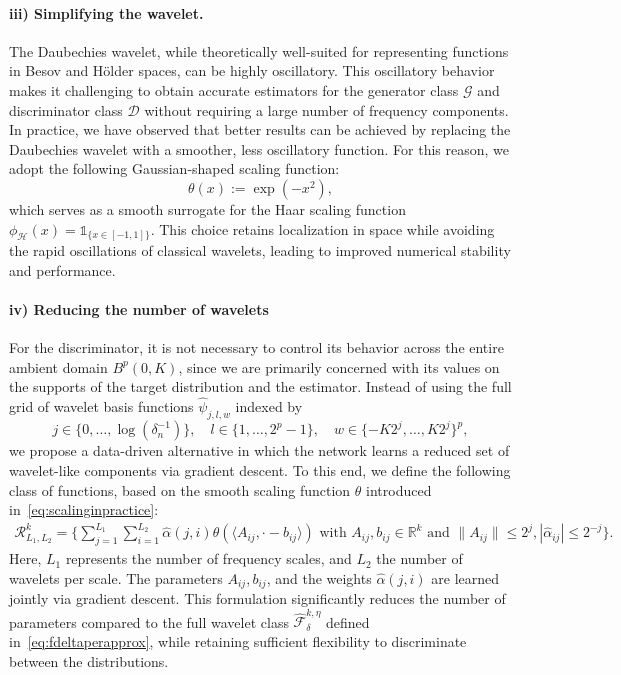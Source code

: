 \documentclass[10pt]{article}
\begin{document}
\paragraph{iii) Simplifying the wavelet.}
The Daubechies wavelet, while theoretically well-suited for representing functions in Besov and Hölder spaces, can be highly oscillatory. This oscillatory behavior makes it challenging to obtain accurate estimators for the generator class \( \mathcal{G} \) and discriminator class \( \mathcal{D} \) without requiring a large number of frequency components.
In practice, we have observed that better results can be achieved by replacing the Daubechies wavelet with a smoother, less oscillatory function. For this reason, we adopt the following Gaussian-shaped scaling function:
\begin{equation}\label{eq:scalinginpractice}
    \theta(x) := \exp(-x^2),
\end{equation}
which serves as a smooth surrogate for the Haar scaling function \( \phi_{\mathcal{H}}(x) = \mathds{1}_{\{x \in [-1,1]\}} \). This choice retains localization in space while avoiding the rapid oscillations of classical wavelets, leading to improved numerical stability and performance.


\paragraph{iv) Reducing the number of wavelets} For the discriminator, it is not necessary to control its behavior across the entire ambient domain \( B^{p}(0, K) \), since we are primarily concerned with its values on the supports of the target distribution and the estimator. Instead of using the full grid of wavelet basis functions \( \hat{\psi}_{j,l,w} \) indexed by
\[
j \in \{0, \dots, \log(\delta_n^{-1})\}, \quad l \in \{1, \dots, 2^p - 1\}, \quad w \in \{-K2^j, \dots, K2^j\}^p,
\]
we propose a data-driven alternative in which the network learns a reduced set of wavelet-like components via gradient descent. To this end, we define the following class of functions, based on the smooth scaling function \( \theta \) introduced in~\eqref{eq:scalinginpractice}: 
\begin{align}\label{eq:practical classes}
\mathcal{R}_{L_1,L_2}^{k}=\Big\{\sum \limits_{j=1}^{L_1}  \sum \limits_{i=1}^{L_2} \hat{\alpha}(j,i) \theta(\langle A_{ij},\cdot-b_{ij}\rangle) \text{ with } A_{ij},b_{ij}\in \mathbb{R}^{k} \text{ and } \|A_{ij}\|\leq 2^{j},|\hat{\alpha}_{ij}|\leq 2^{-j}\Big\}.
\end{align}
Here, \( L_1 \) represents the number of frequency scales, and \( L_2 \) the number of wavelets per scale. The parameters \( A_{ij}, b_{ij} \), and the weights \( \hat{\alpha}(j,i) \) are learned jointly via gradient descent. This formulation significantly reduces the number of parameters compared to the full wavelet class \( \hat{\mathcal{F}}_\delta^{k,\eta} \) defined in~\eqref{eq:fdeltaperapprox}, while retaining sufficient flexibility to discriminate between the distributions.
\end{document}
